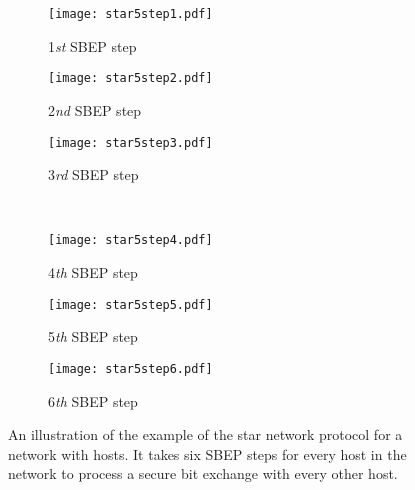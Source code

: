 \documentclass[a4paper,12pt,pdftex]{article}
\begin{document}
\begin{figure}[t]
        \centering
        \begin{subfigure}[b]{0.23\textwidth}
		\caption{1\textit{st} SBEP step}
                \texttt{[image: star5step1.pdf]}
                \label{fig:step1}
        \end{subfigure}\hfill \begin{subfigure}[b]{0.23\textwidth}
		\caption{2\textit{nd} SBEP step}
                \texttt{[image: star5step2.pdf]}
                \label{fig:step2}
        \end{subfigure}
        \hfill \begin{subfigure}[b]{0.23\textwidth}
		\caption{3\textit{rd} SBEP step}
                \texttt{[image: star5step3.pdf]}
                \label{fig:step3}        
        \end{subfigure}
        \\
        \begin{subfigure}[b]{0.23\textwidth}
		\caption{4\textit{th} SBEP step}
                \texttt{[image: star5step4.pdf]}
                \label{fig:step4}
        \end{subfigure}\hfill \begin{subfigure}[b]{0.23\textwidth}
		\caption{5\textit{th} SBEP step}
                \texttt{[image: star5step5.pdf]}
                \label{fig:step5}
        \end{subfigure}
        \hfill \begin{subfigure}[b]{0.23\textwidth}
		\caption{6\textit{th} SBEP step}
                \texttt{[image: star5step6.pdf]}
                \label{fig:step6}        
        \end{subfigure}
        \caption{An illustration of the example of the star network protocol  for a network with  hosts. It takes six SBEP steps for every host in the network to process a secure bit exchange with every other host.}
        \label{fig:steps}
\end{figure}
\end{document}
